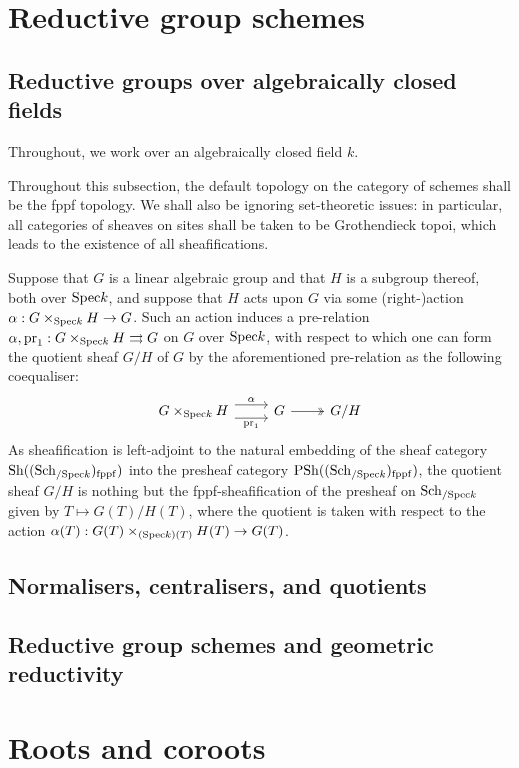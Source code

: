 \section{Reductive group schemes}
    \subsection{Reductive groups over algebraically closed fields}
        \begin{convention}
            Throughout, we work over an algebraically closed field $k$.
        \end{convention}
        
        \begin{convention}
            Throughout this subsection, the default topology on the category of schemes shall be the fppf topology. We shall also be ignoring set-theoretic issues: in particular, all categories of sheaves on sites shall be taken to be Grothendieck topoi, which leads to the existence of all sheafifications. 
        \end{convention}
    
        \begin{convention} \label{conv: linear_algebraic_group_quotients}
            Suppose that $G$ is a linear algebraic group and that $H$ is a subgroup thereof, both over $\mathrm{Spec} k$, and suppose that $H$ acts upon $G$ via some (right-)action $\alpha: G \x_{\Spec k} H \to G$. Such an action induces a pre-relation $\alpha, \pr_1: G \x_{\Spec k} H \toto G$ on $G$ over $\mathrm{Spec} k$, with respect to which one can form the quotient sheaf $G/H$ of $G$ by the aforementioned pre-relation as the following coequaliser:
                $$
                    \begin{tikzcd}
                    	{G \x_{\Spec k} H} & G & {G/H}
                    	\arrow["{\pr_1}"', shift right=2, from=1-1, to=1-2]
                    	\arrow["\alpha", shift left=2, from=1-1, to=1-2]
                    	\arrow["", two heads, from=1-2, to=1-3]
                    \end{tikzcd}
                $$
            As sheafification is left-adjoint to the natural embedding of the sheaf category $\mathrm{Sh}((\mathrm{Sch}_{/\mathrm{Spec} k})_{\mathrm{fppf}})$ into the presheaf category $\mathrm{PSh}((\mathrm{Sch}_{/\mathrm{Spec} k})_{\mathrm{fppf}})$, the quotient sheaf $G/H$ is nothing but the fppf-sheafification of the presheaf on $\mathrm{Sch}_{/\mathrm{Spec} k}$ given by $T \mapsto G(T)/H(T)$, where the quotient is taken with respect to the action $\alpha(T): G(T) \x_{(\Spec k)(T)} H(T) \to G(T)$.
        \end{convention}

    \subsection{Normalisers, centralisers, and quotients}
    
    \subsection{Reductive group schemes and geometric reductivity}

\section{Roots and coroots}